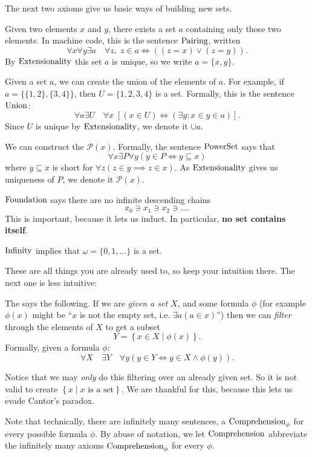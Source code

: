The next two axioms give us basic ways of building new sets.
\begin{itemize}
	\ii Given two elements $x$ and $y$, there exists a set $a$ containing only those two elements.
	In machine code, this is the sentence $\mathrm{Pairing}$, written
	\[ \forall x \forall y \exists a \quad \forall z,
		\; z \in a \iff \left( (z=x) \lor (z=y) \right). \]
	By $\mathrm{Extensionality}$ this set $a$ is unique, so we write $a = \{x,y\}$.

	\ii Given a set $a$, we can create the union of the elements of $a$.
	For example, if $a = \{ \{1,2\}, \{3,4\} \}$, then $U = \{1,2,3,4\}$ is a set.
	Formally, this is the sentence $\mathrm{Union}$:
	\[ \forall a \exists U \quad \forall x \;
		\left[ (x \in U) \iff (\exists y : x \in y \in a) \right]. \]
	Since $U$ is unique by $\mathrm{Extensionality}$, we denote it $\cup a$.

	\ii 
	We can construct the  $\mathcal P(x)$.
	Formally, the sentence $\mathrm{PowerSet}$ says that
	\[ \forall x \exists P \forall y (y \in P \iff y \subseteq x) \]
	where $y \subseteq x$ is short for $\forall z (z \in y \implies z \in x)$.
	As $\mathrm{Extensionality}$ gives us uniqueness of $P$,
	we denote it $\mathcal P(x)$.

	\ii $\mathrm{Foundation}$ says there are no infinite descending chains
	\[ x_0 \ni x_1 \ni x_2 \ni \dots. \]
	This is important, because it lets us induct.
	In particular, \textbf{no set contains itself}.

	\ii $\mathrm{Infinity}$ implies that $\omega = \{0,1,\dots\}$ is a set.
\end{itemize}
These are all things you are already used to, so keep your intuition there.
The next one is less intuitive:
\begin{itemize}
	\ii The  says the following.
	If we are \emph{given a set $X$}, and some formula $\phi$
	(for example $\phi(x)$ might be ``$x$ is not the empty set, i.e. $\exists a(a\in x)$'')
	then we can \emph{filter} through the elements of $X$ to get a subset
	\[ Y = \left\{ x \in X \mid \phi(x) \right\}. \]
	Formally, given a formula $\phi$:
	\[
		\forall X \quad \exists Y \quad
		\forall y (y \in Y \iff y \in X \land \phi(y)).
	\]
\end{itemize}
Notice that we may \emph{only} do this filtering over an already given set.
So it is not valid to create
$ \left\{ x \mid x \text{ is a set} \right\} $.
We are thankful for this, because this lets us evade Cantor's paradox.

\begin{abuse}
	Note that technically, there are infinitely many sentences,
	a $\mathrm{Comprehension}_\phi$ for every possible formula $\phi$.
	By abuse of notation, we let $\mathrm{Comprehension}$ abbreviate
	the infinitely many axioms $\mathrm{Comprehension}_\phi$ for every $\phi$.
\end{abuse}

